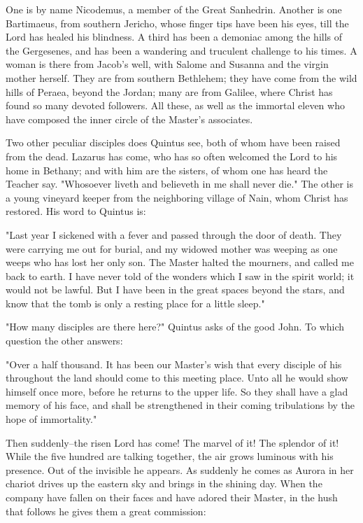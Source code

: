 One is by name Nicodemus, a member of the Great Sanhedrin.  Another
is one Bartimaeus, from southern Jericho, whose finger tips have
been his eyes, till the Lord has healed his blindness.  A third has
been a demoniac among the hills of the Gergesenes, and has been a
wandering and truculent challenge to his times.  A woman is there
from Jacob's well, with Salome and Susanna and the virgin mother
herself.  They are from southern Bethlehem; they have come from the
wild hills of Peraea, beyond the Jordan; many are from Galilee,
where Christ has found so many devoted followers.  All these, as
well as the immortal eleven who have composed the inner circle of
the Master's associates.

Two other peculiar disciples does Quintus see, both of whom have
been raised from the dead.  Lazarus has come, who has so often
welcomed the Lord to his home in Bethany; and with him are the
sisters, of whom one has heard the Teacher say.  "Whosoever liveth
and believeth in me shall never die."  The other is a young
vineyard keeper from the neighboring village of Nain, whom Christ
has restored.  His word to Quintus is:

"Last year I sickened with a fever and passed through the door of
death.  They were carrying me out for burial, and my widowed mother
was weeping as one weeps who has lost her only son.  The Master
halted the mourners, and called me back to earth.  I have never
told of the wonders which I saw in the spirit world; it would not
be lawful.  But I have been in the great spaces beyond the stars,
and know that the tomb is only a resting place for a little sleep."

"How many disciples are there here?" Quintus asks of the good John.
To which question the other answers:

"Over a half thousand.  It has been our Master's wish that every
disciple of his throughout the land should come to this meeting
place.  Unto all he would show himself once more, before he returns
to the upper life.  So they shall have a glad memory of his face,
and shall be strengthened in their coming tribulations by the hope
of immortality."

Then suddenly--the risen Lord has come!  The marvel of it!  The
splendor of it!  While the five hundred are talking together, the
air grows luminous with his presence.  Out of the invisible he
appears.  As suddenly he comes as Aurora in her chariot drives up
the eastern sky and brings in the shining day.  When the company
have fallen on their faces and have adored their Master, in the
hush that follows he gives them a great commission:

